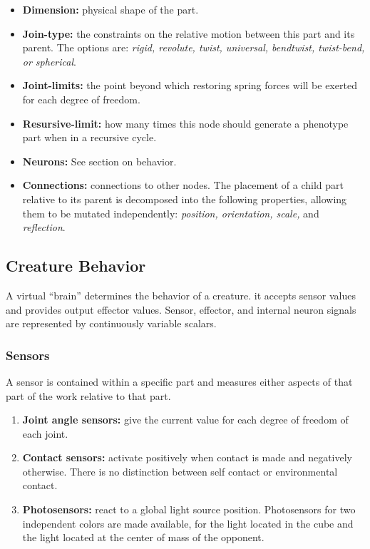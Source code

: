 \documentclass[../main.tex]{subfiles}
\begin{document}
\begin{itemize}
	\item \textbf{Dimension:} physical shape of the part.
	\item \textbf{Join-type:}  the constraints on the relative motion between this part and its parent. The options
	are: \emph{rigid, revolute, twist, universal, bendtwist, twist-bend, or spherical}.
	\item \textbf{Joint-limits:} the point beyond which restoring spring forces will be exerted for each degree of
	freedom.
	\item \textbf{Resursive-limit:}  how many times this node should generate a phenotype part when in a recursive
	cycle.
	\item \textbf{Neurons:} See section on behavior.
	\item \textbf{Connections:} connections to other nodes.  The placement of a child part relative to its parent is
	decomposed into the following properties, allowing them to be mutated independently: \emph{position, orientation,
	scale,} and \emph{reflection}.
\end{itemize}

\subsection{Creature Behavior}

A virtual ``brain'' determines the behavior of a creature. it accepts sensor values and provides output effector
values. Sensor, effector, and internal neuron signals are represented by continuously variable scalars.

\subsubsection{Sensors}
A sensor is contained within a specific part and measures either aspects of that part of the work relative to that
part.

\begin{enumerate}
	\item \textbf{Joint angle sensors:} give the current value for each degree of freedom of each joint.
	\item \textbf{Contact sensors:} activate positively when contact is made and negatively otherwise. There is no
	distinction between self contact or environmental contact.
	\item \textbf{Photosensors:}  react to a global light source position. Photosensors for two independent colors are
	made available, for the light located in the cube and the light located at the center of mass of the opponent.
\end{enumerate}
\end{document}
